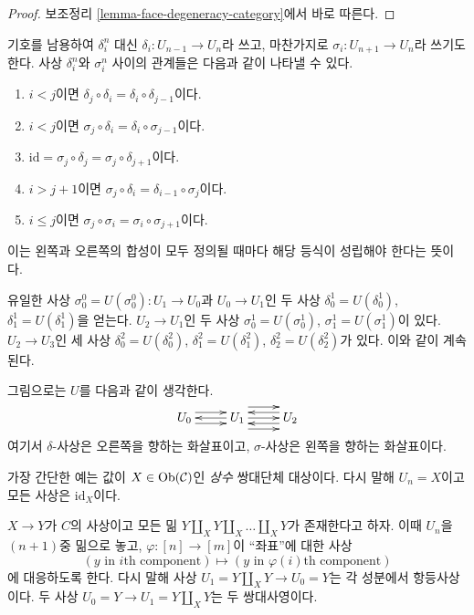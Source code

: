 \begin{proof}
보조정리 \ref{lemma-face-degeneracy-category}에서 바로 따른다.
\end{proof}

\begin{remark}
\label{remark-relations-cosimplicial}
기호를 남용하여 $\delta^n_i$ 대신
$\delta_i : U_{n - 1} \to U_n$라 쓰고, 마찬가지로
$\sigma_i : U_{n + 1} \to U_n$라 쓰기도 한다.
사상 $\delta^n_i$와 $\sigma^n_i$ 사이의 관계들은 다음과 같이
나타낼 수 있다.
\begin{enumerate}
\item $i < j$이면
$\delta_j \circ \delta_i = \delta_i \circ \delta_{j - 1}$이다.
\item $i < j$이면
$\sigma_j \circ \delta_i = \delta_i \circ \sigma_{j - 1}$이다.
\item $\text{id} = \sigma_j \circ \delta_j = \sigma_j \circ \delta_{j + 1}$이다.
\item $i > j + 1$이면
$\sigma_j \circ \delta_i = \delta_{i - 1} \circ \sigma_j$이다.
\item $i \leq j$이면
$\sigma_j \circ \sigma_i = \sigma_i \circ \sigma_{j + 1}$이다.
\end{enumerate}
이는 왼쪽과 오른쪽의 합성이 모두 정의될 때마다 해당 등식이
성립해야 한다는 뜻이다.
\end{remark}

\noindent
유일한 사상 $\sigma^0_0 = U(\sigma^0_0) : U_1 \to U_0$과
$U_0 \to U_1$인 두 사상 $\delta^1_0 = U(\delta^1_0)$,
$\delta^1_1 = U(\delta^1_1)$을 얻는다.
$U_2 \to U_1$인 두 사상
$\sigma^1_0 = U(\sigma^1_0)$, $\sigma^1_1 = U(\sigma^1_1)$이 있다.
$U_2 \to U_3$인 세 사상
$\delta^2_0 = U(\delta^2_0)$, $\delta^2_1 = U(\delta^2_1)$,
$\delta^2_2 = U(\delta^2_2)$가 있다. 이와 같이 계속된다.

\medskip\noindent
그림으로는 $U$를 다음과 같이 생각한다.
$$
\xymatrix{
U_0
\ar@<1ex>[r]
\ar@<-1ex>[r]
&
U_1
\ar@<0ex>[l]
\ar@<2ex>[r]
\ar@<0ex>[r]
\ar@<-2ex>[r]
&
U_2
\ar@<1ex>[l]
\ar@<-1ex>[l]
}
$$
여기서 $\delta$-사상은 오른쪽을 향하는 화살표이고,
$\sigma$-사상은 왼쪽을 향하는 화살표이다.

\begin{example}
\label{example-constant-cosimplicial-object}
가장 간단한 예는 값이 $X \in \mathop{\mathrm{Ob}}\nolimits(\mathcal{C})$인
{\it 상수} 쌍대단체 대상이다. 다시 말해 $U_n = X$이고
모든 사상은 $\text{id}_X$이다.
\end{example}

\begin{example}
\label{example-push-outs-simplicial-object}
$X\to Y$가 $C$의 사상이고 모든 밂
$Y\amalg_X Y \amalg_X \ldots \amalg_X Y$가 존재한다고 하자.
이때 $U_n$을 $(n + 1)$중 밂으로 놓고,
$\varphi : [n] \to [m]$이 ``좌표''에 대한 사상
$$
(y \text{ in }i\text{th component})
\mapsto
(y \text{ in }\varphi(i)\text{th component})
$$
에 대응하도록 한다. 다시 말해 사상
$U_1 = Y \amalg_X Y \to U_0 = Y$는 각 성분에서 항등사상이다.
두 사상 $U_0 = Y \to U_1 = Y \amalg_X Y$는 두 쌍대사영이다.
\end{example}

